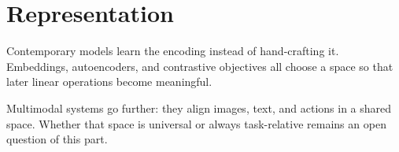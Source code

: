 \chapter{Representation}
\label{ch:representation}

Contemporary models learn the encoding instead of hand-crafting it. Embeddings, autoencoders, and contrastive objectives all choose a space so that later linear operations become meaningful.

Multimodal systems go further: they align images, text, and actions in a shared space. Whether that space is universal or always task-relative remains an open question of this part.
